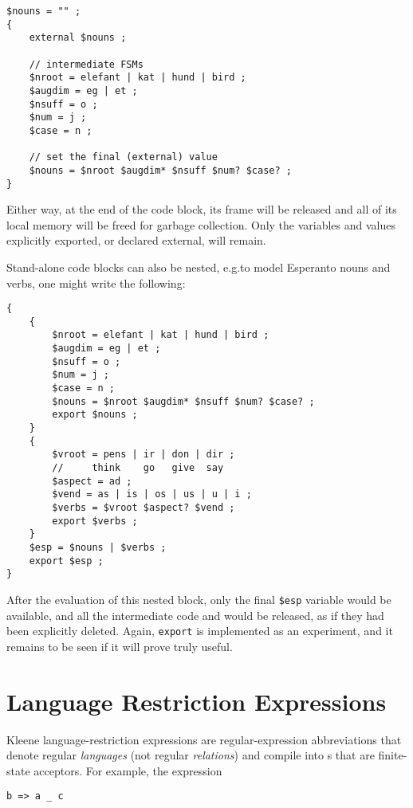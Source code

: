 \begin{Verbatim}
$nouns = "" ;
{
    external $nouns ;

    // intermediate FSMs 
    $nroot = elefant | kat | hund | bird ;
    $augdim = eg | et ;
    $nsuff = o ;
    $num = j ;
    $case = n ;

    // set the final (external) value
    $nouns = $nroot $augdim* $nsuff $num? $case? ;
}
\end{Verbatim}

\noindent
Either way, at the end of the code block, its frame will be released and
all of its local memory will be freed for garbage collection.  Only the
variables and values explicitly exported, or declared external, will
remain.

Stand-alone code blocks can also be nested, e.g.\@ to model Esperanto
nouns and verbs, one might write the following:

\begin{Verbatim}
{
    {
        $nroot = elefant | kat | hund | bird ;
        $augdim = eg | et ;
        $nsuff = o ;
        $num = j ;
        $case = n ;
        $nouns = $nroot $augdim* $nsuff $num? $case? ;
        export $nouns ;
    }
    {
        $vroot = pens | ir | don | dir ;
        //     think    go   give  say
        $aspect = ad ;
        $vend = as | is | os | us | u | i ;
        $verbs = $vroot $aspect? $vend ;
        export $verbs ;
    }
    $esp = $nouns | $verbs ;
    export $esp ;
}
\end{Verbatim}

\noindent
After the evaluation of this nested block, only the final \verb!$esp!
variable would be available, and all the intermediate code and  
would be released, as if they had been explicitly deleted.
Again, \texttt{export} is implemented as an experiment, and it remains
to be seen if it will prove truly useful.

\section{Language Restriction Expressions}

Kleene language-restriction expressions are regular-expression
abbreviations that denote regular \emph{languages} (not regular
\emph{relations}) and compile into \fsm{}s that are finite-state
acceptors.  For
example, the expression

\begin{Verbatim}
b => a _ c
\end{Verbatim}

